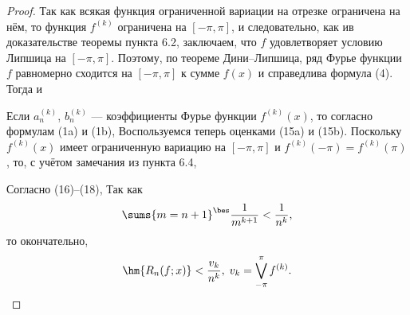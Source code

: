 \documentclass[a4paper]{article}
\begin{document}
\begin{proof}
Так как всякая функция ограниченной вариации на отрезке ограничена
на нём, то функция $f^{(k)}$ ограничена на $[-\pi,\pi]$, и
следовательно, как ив доказательстве теоремы пункта 6.2, заключаем,
что $f$ удовлетворяет условию Липшица на $[-\pi,\pi]$. Поэтому, по
теореме Дини--Липшица, ряд Фурье функции $f$ равномерно сходится на
$[-\pi,\pi]$ к сумме $f(x)$ и справедлива формула (4). Тогда
 и 

Если $a_n^{(k)}$, $b_n^{(k)}$ --- коэффициенты Фурье функции
$f^{(k)}(x)$, то согласно формулам (1a) и (1b), 
Воспользуемся теперь оценками (15a) и (15b). Поскольку $f^{(k)}(x)$
имеет ограниченную вариацию на $[-\pi,\pi]$ и $f^{(k)}(-\pi) =
f^{(k)}(\pi)$, то, с учётом замечания из пункта 6.4,

Согласно (16)--(18),  Так как $$\sums{m=n+1}^{\bes}
\frac1{m^{k+1}} < \frac1{n^k},$$ то окончательно, $$\hm{R_n(f;x)} <
\frac{v_k}{n^k}, \; v_k = \bigvee\limits_{-\pi}^{\pi} f^{(k)}.$$
\end{proof}
\end{document}
